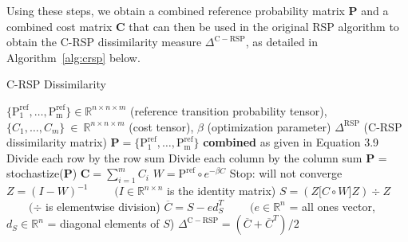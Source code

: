 Using these steps, we obtain a combined reference probability matrix $\mathbf{P}$ and a combined cost matrix $\mathbf{C}$ that can then be used in the original RSP algorithm to obtain the C-RSP dissimilarity measure $\Delta^{\mathrm{C-RSP}}$, as detailed in Algorithm~\ref{alg:crsp} below.
\begin{algorithm}
    \caption{C-RSP Dissimilarity}
    \label{alg:crsp}

    \begin{algorithmic}
	\REQUIRE $\{\mathrm{P_1^{ref}}, \ldots, \mathrm{P_m^{ref}}  \}\in \mathbb{R}^{n \times n \times m}$  (reference transition probability tensor), $\{C_1, \ldots, C_m \}~\in~\mathbb{R}^{n \times n \times m}$ (cost tensor), $\beta$ (optimization parameter)
	\ENSURE $\Delta^{\mathrm{RSP}}$ (C-RSP dissimilarity matrix)
	\STATE $\mathbf{P} =  \{ \mathrm{P_1^{ref}}, \ldots, \mathrm{P_m^{ref}}  \}$ \textbf{combined} as given in Equation 3.9
		\STATE Divide each row by the row sum
		\STATE Divide each column by the column sum
	\ENDWHILE
	\STATE $\mathbf{P}$ = stochastize($\mathbf{P}$)
	\STATE $\mathbf{C} =  \sum\limits_{i=1}^{m} C_i$ 
	\STATE $ W = \mathrm{P^{ref}} \circ e^{ -\beta C}$
	\STATE Stop: will not converge
          \ENDIF	
	\STATE $Z = (I - W)^{-1}$   $\qquad (I \in \mathbb{R}^{n \times n}$ is the identity matrix)
	\STATE $S = (Z\lbrack C \circ W \rbrack Z) \div Z$   $\qquad (\div$ is elementwise division)
	\STATE $\overline{C} = S - ed_S^T$   $\qquad  (e \in \mathbb{R}^n$ = all ones vector, $d_S\in \mathbb{R}^n$ = diagonal
 elements of $S$)
	\STATE $\Delta^{\mathrm{C-RSP}} = (\overline{C} + \overline{C}^T)/2$
    \end{algorithmic}

\end{algorithm}
